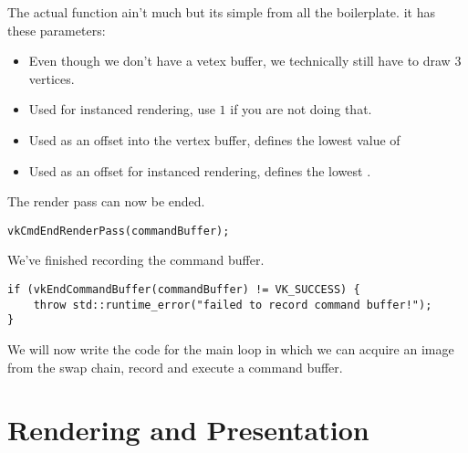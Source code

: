\par The actual  function ain't much but its simple from all the boilerplate. it has these parameters:

\begin{itemize}
    \item {} Even though we don't have a vetex buffer, we technically still have to draw 3 vertices.
    \item {} Used for instanced rendering, use $1$ if you are not doing that.
    \item {} Used as an offset into the vertex buffer, defines the lowest value of 
    \item {} Used as an offset for instanced rendering, defines the lowest .
\end{itemize}

\par The render pass can now be ended. 

\begin{center}
\begin{minipage}{0.95\linewidth}
\begin{lstlisting}
vkCmdEndRenderPass(commandBuffer);
\end{lstlisting}
\end{minipage}
\end{center}

\par We've finished recording the command buffer.

\begin{center}
\begin{minipage}{0.95\linewidth}
\begin{lstlisting}
if (vkEndCommandBuffer(commandBuffer) != VK_SUCCESS) {
    throw std::runtime_error("failed to record command buffer!");
}
\end{lstlisting}
\end{minipage}
\end{center}

\par We will now write the code for the main loop in which we can acquire an image from the swap chain, record and execute a command buffer.

\section*{Rendering and Presentation}
